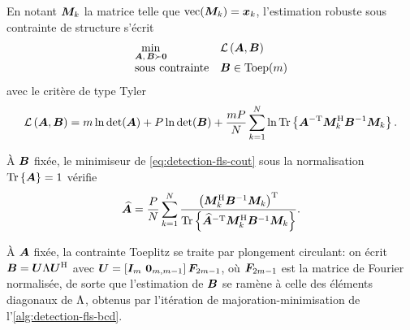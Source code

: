 \begin{definition}
\label{def:detection-fls-optim}
  En notant $\boldsymbol{M}_k$ la matrice telle que $\operatorname{vec}(\boldsymbol{M}_k)=\boldsymbol{x}_k$, l'estimation robuste sous contrainte de structure s'écrit 
  \begin{equation}
    \begin{array}{ll}
      \displaystyle\min_{\boldsymbol{A},\,\boldsymbol{B}\succ\boldsymbol{0}} & \mathcal{L}\left(\boldsymbol{A},\boldsymbol{B}\right) \\[4pt]
      \text{sous contrainte} & \boldsymbol{B} \in \mathrm{Toep}(m)
    \end{array}
    \label{eq:detection-fls-optim}
  \end{equation}
  avec le critère de type Tyler
  \begin{equation}
    \mathcal{L}\left(\boldsymbol{A},\boldsymbol{B}\right)
    =
    m\ln\operatorname{\operatorname{det}}(\boldsymbol{A})
    + P\ln\operatorname{\operatorname{det}}(\boldsymbol{B})
    + \frac{mP}{N}\sum_{k=1}^{N}
      \ln\operatorname{\operatorname{Tr}}\left\{\boldsymbol{A}^{-\mathrm{T}}\boldsymbol{M}_k^{\mathrm{H}}{\boldsymbol{B}}^{-1}\boldsymbol{M}_k\right\}.
    \label{eq:detection-fls-cout}
  \end{equation}
\end{definition}


\begin{proposition}
\label{prop:detection-fls-A}
  À $\boldsymbol{B}$ fixée, le minimiseur de \cref{eq:detection-fls-cout} sous la normalisation $\operatorname{\operatorname{Tr}}\left\{\boldsymbol{A}\right\}=1$ vérifie
  \begin{equation}
    \widehat{\boldsymbol{A}}
    =
    \frac{P}{N}\sum_{k=1}^{N}
    \frac{\left(\boldsymbol{M}_k^{\mathrm{H}}{\boldsymbol{B}}^{-1}\boldsymbol{M}_k\right)^{\mathrm{T}}}
         {\operatorname{\operatorname{Tr}}\left\{\widehat{\boldsymbol{A}}^{-\mathrm{T}}\boldsymbol{M}_k^{\mathrm{H}}{\boldsymbol{B}}^{-1}\boldsymbol{M}_k\right\}}.
    \label{eq:detection-fls-A}
  \end{equation}
\end{proposition}

\begin{proposition}
\label{prop:detection-fls-B}
  À $\boldsymbol{A}$ fixée, la contrainte Toeplitz se traite par plongement circulant: on écrit $\boldsymbol{B} = \boldsymbol{U}\Lambda\boldsymbol{U}^{\mathrm{H}}$ avec $\Unit = \left[\Id{\Nsensor}\ \vector{0}_{\Nsensor,\Nsensor-1}\right]\mat{F}_{2\Nsensor-1}$, où $\boldsymbol{F}_{2m-1}$ est la matrice de Fourier normalisée, de sorte que l'estimation de $\boldsymbol{B}$ se ramène à celle des éléments diagonaux de $\Lambda$, obtenus par l'itération de majoration-minimisation de l'\cref{alg:detection-fls-bcd}.
\end{proposition}


